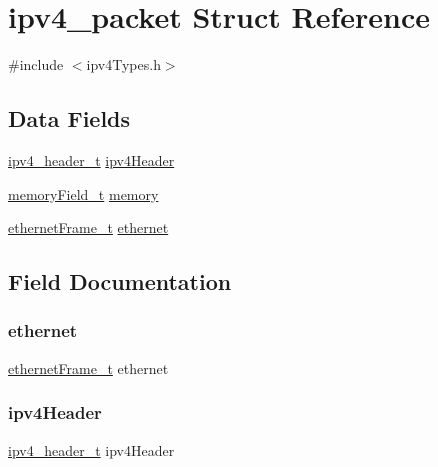 \hypertarget{structipv4__packet}{}\section{ipv4\+\_\+packet Struct Reference}
\label{structipv4__packet}


{\ttfamily \#include $<$ipv4\+Types.\+h$>$}

\subsection*{Data Fields}
\begin{DoxyCompactItemize}
\item 
\mbox{\hyperlink{group__ipv4_gaf4f2c6743b9fb1ea3c69734612ce41de}{ipv4\+\_\+header\+\_\+t}} \mbox{\hyperlink{structipv4__packet_a085146dbd62b99710f898b189350d50c}{ipv4\+Header}}
\item 
\mbox{\hyperlink{group__memory_ga1d04d80fae40964f55d2df46b5d64785}{memory\+Field\+\_\+t}} \mbox{\hyperlink{structipv4__packet_ad8f3b87ff206655025f5734f21bce6e7}{memory}}
\item 
\mbox{\hyperlink{group__ethernet_ga7519a7ae14b490659069435698d28a25}{ethernet\+Frame\+\_\+t}} \mbox{\hyperlink{structipv4__packet_a3dbe1f2bdb0b4f268db5f57fee84c4ba}{ethernet}}
\end{DoxyCompactItemize}


\subsection{Field Documentation}
\mbox{\label{structipv4__packet_a3dbe1f2bdb0b4f268db5f57fee84c4ba}} 
\subsubsection{\texorpdfstring{ethernet}{ethernet}}
{\footnotesize\ttfamily \mbox{\hyperlink{group__ethernet_ga7519a7ae14b490659069435698d28a25}{ethernet\+Frame\+\_\+t}} ethernet}

\mbox{\label{structipv4__packet_a085146dbd62b99710f898b189350d50c}} 
\subsubsection{\texorpdfstring{ipv4Header}{ipv4Header}}
{\footnotesize\ttfamily \mbox{\hyperlink{group__ipv4_gaf4f2c6743b9fb1ea3c69734612ce41de}{ipv4\+\_\+header\+\_\+t}} ipv4\+Header}

